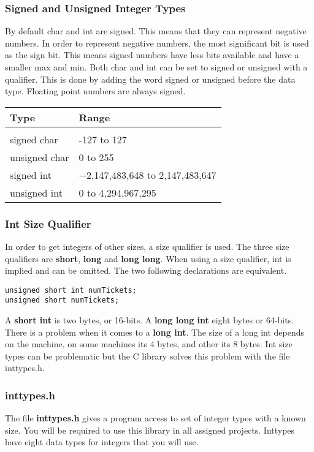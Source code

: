 \documentclass[10pt,a4paper]{paper}
\begin{document}
\subsubsection*{Signed and Unsigned Integer Types}
By default char and int are signed.  This means that they can represent negative numbers.  In order to represent negative numbers, the most significant bit is used as the sign bit.  This means signed numbers have less bits available and have a smaller max and min.  Both char and int can be set to signed or unsigned with a qualifier.  This is done by adding the word signed or unsigned before the data type. Floating point numbers are always signed.  

\begin{tabular}{l l}
Type & Range \\
\hline \\
signed char & -127 to 127 \\
unsigned char & 0 to 255 \\
signed int & −2,147,483,648 to 2,147,483,647 \\
unsigned int & 0 to 4,294,967,295
\end{tabular}

\subsubsection*{Int Size Qualifier}

In order to get integers of other sizes, a size qualifier is used.  The three size qualifiers are \textbf{short}, \textbf{long} and \textbf{long long}.  When using a size qualifier, int is implied and can be omitted.  The two following declarations are equivalent.

\begin{lstlisting}
unsigned short int numTickets;
unsigned short numTickets;
\end{lstlisting}

A \textbf{short int} is two bytes, or 16-bits.  A \textbf{long long int} eight bytes or 64-bits.  There is a problem when it comes to a \textbf{ long int}.  The size of a long int depends on the machine, on some machines its 4 bytes, and other its 8 bytes.  Int size types can be problematic but the C library solves this problem with the file inttypes.h.

\subsubsection*{inttypes.h}
The file \textbf{inttypes.h} gives a program access to set of integer types with a known size.  You will be required to use this library in all assigned projects.  Inttypes have eight data types for integers that you will use.
\end{document}
